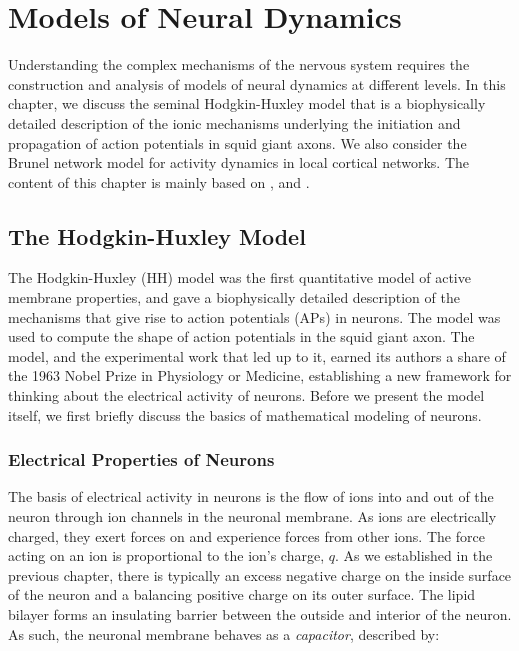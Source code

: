 \chapter{Models of Neural Dynamics}\label{chap:compneuro}

Understanding the complex mechanisms of the nervous system requires the construction and analysis of models of neural dynamics at different levels. In this chapter, we discuss the seminal Hodgkin-Huxley model \cite{HH1952} that is a biophysically detailed description of the ionic mechanisms underlying the initiation and propagation of action potentials in squid giant axons. We also consider the Brunel network model \cite{Brunel2000} for activity dynamics in local cortical networks. The content of this chapter is mainly based on \cite{Sterratt}, \cite{dayan_abbott} and \cite{neuro_dynamics}.


\section{The Hodgkin-Huxley Model}

The Hodgkin-Huxley (HH) model was the first quantitative model of active membrane properties, and gave a biophysically detailed description of the mechanisms that give rise to action potentials (APs) in neurons. The model was used to compute the shape of action potentials in the squid giant axon. The model, and the experimental work that led up to it, earned its authors a share of the 1963 Nobel Prize in Physiology or Medicine, establishing a new framework for thinking about the electrical activity of neurons. Before we present the model itself, we first briefly discuss the basics of mathematical modeling of neurons. 


\subsection{Electrical Properties of Neurons}

The basis of electrical activity in neurons is the flow of ions into and out of the neuron through ion channels in the neuronal membrane. As ions are electrically charged, they exert forces on and experience forces from other ions. The force acting on an ion is proportional to the ion's charge, $q$. As we established in the previous chapter, there is typically an excess negative charge on the inside surface of the neuron and a balancing positive charge on its outer surface. The lipid bilayer forms an insulating barrier between the outside and interior of the neuron. As such, the neuronal membrane behaves as a \textit{capacitor}, described by:

